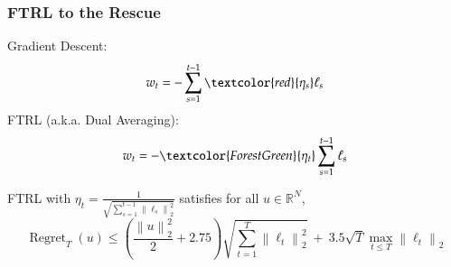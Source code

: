 \documentclass[usenames,dvipsnames]{beamer}
\DeclareMathOperator{\Regret}{Regret}
\newcommand{\R}{\mathbb{R}}
\newcommand{\norm}[1]{\left\|#1\right\|}
\begin{document}
\begin{frame}
\frametitle{FTRL to the Rescue}

Gradient Descent:
$$
w_t = - \sum_{s=1}^{t-1} \textcolor{red}{\eta_s} \ell_s
$$
FTRL (a.k.a. Dual Averaging):
$$
w_t = - \textcolor{ForestGreen}{\eta_t} \sum_{s=1}^{t-1} \ell_s
$$

\begin{theorem}[Orabona-P. '15]
FTRL with $\eta_t = \frac{1}{\sqrt{\sum_{s=1}^{t-1} \norm{\ell_s}_2^2}}$
satisfies for all $u \in \R^N$,
$$
\Regret_T(u) \le \left(\frac{\norm{u}_2^2}{2} + 2.75 \right) \sqrt{\sum_{t=1}^T \norm{\ell_t}_2^2} \ + \ 3.5 \sqrt{T} \max_{t \le T} \norm{\ell_t}_2
$$
\end{theorem}

\end{frame}
\end{document}
